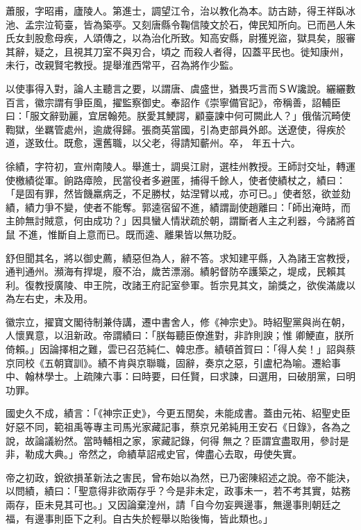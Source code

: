\begin{pinyinscope}
 蕭服，字昭甫，廬陵人。第進士，調望江令，治以教化為本。訪古跡，得王祥臥冰池、孟宗泣筍臺，皆為築亭。又刻唐縣令鞠信陵文於石，俾民知所向。已而邑人朱氏女刲股愈母疾，人頌傳之，以為治化所致。知高安縣，尉獲兇盜，獄具矣，服審其辭，疑之，且視其刀室不與刃合，頃之
 而殺人者得，囚蓋平民也。徙知康州，未行，改親賢宅教授。提舉淮西常平，召為將作少監。



 以使事得入對，論人主聽言之要，以謂唐、虞盛世，猶畏巧言而ＳＷ讒說。纚纚數百言，徽宗謂有爭臣風，擢監察御史。奉詔作《崇寧備官記》，帝稱善，詔輔臣曰：「服文辭勁麗，宜居翰苑。朕愛其鯁諤，顧臺諫中何可闕此人？」俄偕沉畸使鞫獄，坐羈管處州，逾歲得歸。張商英當國，引為吏部員外郎。送遼使，得疾於道，遂致仕。既愈，還舊職，以父老，得請知蘄州。卒，
 年五十六。



 徐績，字符初，宣州南陵人。舉進士，調吳江尉，選桂州教授。王師討交址，轉運使檄績從軍。餉路瘴險，民當役者多避匿，捕得千餘人，使者使績杖之，績曰：「是固有罪，然皆饑羸病乏，不足勝杖，姑涅臂以戒，亦可已。」使者怒，欲並劾績，績力爭不變，使者不能奪。郭逵宿留不進，績謂副使趙離曰：「師出淹時，而主帥無討賊意，何由成功？」因具蠻人情狀疏於朝，謂斷者人主之利器，今諸將首鼠
 不進，惟斷自上意而已。既而逵、離果皆以無功貶。



 舒但聞其名，將以御史薦，績惡但為人，辭不答。求知建平縣，入為諸王宮教授，通判通州。瀕海有捍堤，廢不治，歲苦漂溺。績躬督防卒護築之，堤成，民賴其利。復教授廣陵、申王院，改諸王府記室參軍。哲宗見其文，諭獎之，欲俟滿歲以為左右史，未及用。



 徽宗立，擢寶文閣待制兼侍講，遷中書舍人，修《神宗史》。時紹聖黨與尚在朝，人懷異意，以沮新政。帝謂績曰：「朕每聽臣僚進對，非詐則諛；惟
 卿鯁直，朕所倚賴。」因論擇相之難，雲已召范純仁、韓忠彥。績頓首賀曰：「得人矣！」詔與蔡京同校《五朝寶訓》。績不肯與京聯職，固辭，奏京之惡，引盧杞為喻。遷給事中、翰林學士。上疏陳六事：曰時要，曰任賢，曰求諫，曰選用，曰破朋黨，曰明功罪。



 國史久不成，績言：「《神宗正史》，今更五閏矣，未能成書。蓋由元祐、紹聖史臣好惡不同，範祖禹等專主司馬光家藏記事，蔡京兄弟純用王安石《日錄》，各為之說，故論議紛然。當時輔相之家，家藏記錄，何得
 無之？臣謂宜盡取用，參討是非，勒成大典。」帝然之，命績草詔戒史官，俾盡心去取，毋使失實。



 帝之初政，銳欲損革新法之害民，曾布始以為然，已乃密陳紹述之說。帝不能決，以問績，績曰：「聖意得非欲兩存乎？今是非未定，政事未一，若不考其實，姑務兩存，臣未見其可也。」又因論棄湟州，請「自今勿妄興邊事，無邊事則朝廷之福，有邊事則臣下之利。自古失於輕舉以貽後悔，皆此類也。」




\end{pinyinscope}

